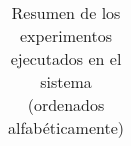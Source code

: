 \begin{table}[H]
\begin{adjustbox}{width=\textwidth}
\begin{tabular}{|p{3.8cm}|p{3.8cm}|p{4.2cm}|p{3.8cm}|p{2cm}|}
\end{tabular}
\end{adjustbox}
\caption{Resumen de los experimentos ejecutados en el sistema (ordenados alfabéticamente)}
\label{tab:resumen-experimentos}
\end{table}
